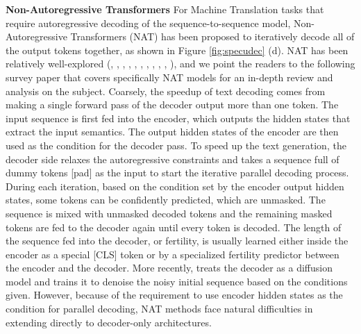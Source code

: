 \textbf{Non-Autoregressive Transformers} For Machine Translation tasks that require autoregressive decoding of the sequence-to-sequence model, Non-Autoregressive Transformers (NAT) has been proposed to iteratively decode all of the output tokens together, as shown in Figure \ref{fig:specudec} (d). NAT has been relatively well-explored (\cite{gu2017non}, \cite{wang2019non}, \cite{li2019hint}, \cite{sun2019fast}, \cite{wei2019imitation}, \cite{shao2020minimizing}, \cite{lee2018deterministic}, \cite{ghazvininejad2019maskpredict}, \cite{guo-etal-2020-jointly}, \cite{gu2020fully}, \cite{savinov2021step}), and we point the readers to the following survey paper that covers specifically NAT models \cite{xiao2023survey} for an in-depth review and analysis on the subject. 
Coarsely, the speedup of text decoding comes from making a single forward pass of the decoder output more than one token. The input sequence is first fed into the encoder, which outputs the hidden states that extract the input semantics. The output hidden states of the encoder are then used as the condition for the decoder pass. To speed up the text generation, the decoder side relaxes the autoregressive constraints and takes a sequence full of dummy tokens [pad] as the input to start the iterative parallel decoding process. During each iteration, based on the condition set by the encoder output hidden states, some tokens can be confidently predicted, which are unmasked. 
The sequence is mixed with unmasked decoded tokens and the remaining masked tokens are fed to the decoder again until every token is decoded. 
The length of the sequence fed into the decoder, or fertility, is usually learned either inside the encoder as a special [CLS] token or by a specialized fertility predictor between the encoder and the decoder. More recently, \cite{savinov2021step} treats the decoder as a diffusion model and trains it to denoise the noisy initial sequence based on the conditions given. However, because of the requirement to use encoder hidden states as the condition for parallel decoding, NAT methods face natural difficulties in extending directly to decoder-only architectures. 

